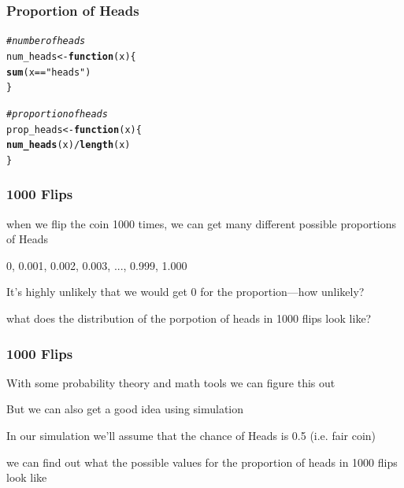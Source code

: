 \documentclass[12pt]{beamer}\usepackage[]{graphicx}\usepackage[]{color}
\makeatletter
\newcommand{\hlstr}[1]{\textcolor[rgb]{0.192,0.494,0.8}{#1}}%
\newcommand{\hlcom}[1]{\textcolor[rgb]{0.678,0.584,0.686}{\textit{#1}}}%
\newcommand{\hlopt}[1]{\textcolor[rgb]{0,0,0}{#1}}%
\newcommand{\hlstd}[1]{\textcolor[rgb]{0.345,0.345,0.345}{#1}}%
\newcommand{\hlkwa}[1]{\textcolor[rgb]{0.161,0.373,0.58}{\textbf{#1}}}%
\newcommand{\hlkwb}[1]{\textcolor[rgb]{0.69,0.353,0.396}{#1}}%
\newcommand{\hlkwc}[1]{\textcolor[rgb]{0.333,0.667,0.333}{#1}}%
\newcommand{\hlkwd}[1]{\textcolor[rgb]{0.737,0.353,0.396}{\textbf{#1}}}%
\newenvironment{kframe}{%
 \def\at@end@of@kframe{}%
 \ifinner\ifhmode%
  \def\at@end@of@kframe{\end{minipage}}%
  \begin{minipage}{\columnwidth}%
 \fi\fi%
 \def\FrameCommand##1{\hskip\@totalleftmargin \hskip-\fboxsep
 \colorbox{shadecolor}{##1}\hskip-\fboxsep
     \hskip-\linewidth \hskip-\@totalleftmargin \hskip\columnwidth}%
 \MakeFramed {\advance\hsize-\width
   \@totalleftmargin\z@ \linewidth\hsize
   \@setminipage}}%
 {\par\unskip\endMakeFramed%
 \at@end@of@kframe}
\newenvironment{knitrout}{}{} %
\makeatother
\begin{document}

\begin{frame}[fragile]
\frametitle{Proportion of Heads}

\begin{knitrout}\footnotesize
{}\color{fgcolor}\begin{kframe}
\begin{alltt}
\hlcom{# number of heads}
\hlstd{num_heads} \hlkwb{<-} \hlkwa{function}\hlstd{(}\hlkwc{x}\hlstd{) \{}
  \hlkwd{sum}\hlstd{(x} \hlopt{==} \hlstr{"heads"}\hlstd{)}
\hlstd{\}}


\hlcom{# proportion of heads}
\hlstd{prop_heads} \hlkwb{<-} \hlkwa{function}\hlstd{(}\hlkwc{x}\hlstd{) \{}
  \hlkwd{num_heads}\hlstd{(x)} \hlopt{/} \hlkwd{length}\hlstd{(x)}
\hlstd{\}}
\end{alltt}
\end{kframe}
\end{knitrout}

\end{frame}


\begin{frame}[fragile]
\frametitle{1000 Flips}

\bbi
  \item when we flip the coin 1000 times, we can get many different possible proportions of Heads
  \item 0, 0.001, 0.002, 0.003, ..., 0.999, 1.000
  \item It's highly unlikely that we would get 0 for the proportion---how unlikely?
  \item what does the distribution of the porpotion of heads in 1000 flips look like?
\ei

\end{frame}


\begin{frame}[fragile]
\frametitle{1000 Flips}

\bbi
  \item With some probability theory and math tools we can figure this out
  \item But we can also get a good idea using simulation
  \item In our simulation we'll assume that the chance of Heads is 0.5 (i.e. fair coin)
  \item we can find out what the possible values for the proportion of heads in 1000 flips look like
\ei

\end{frame}
\end{document}
